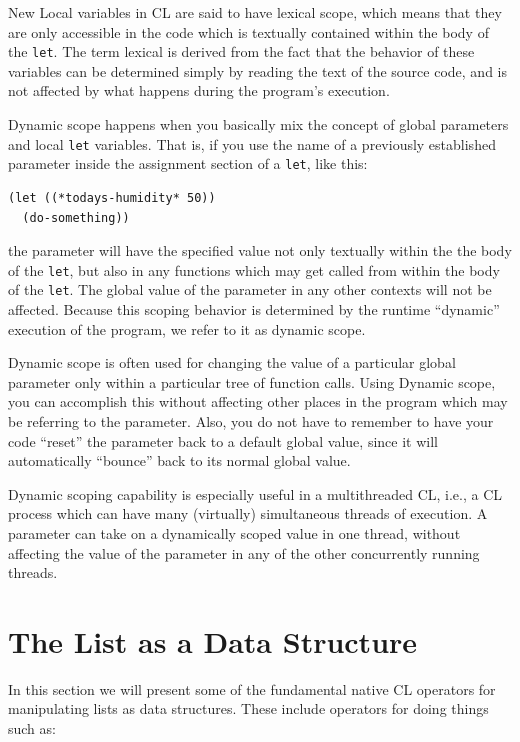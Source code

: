 New Local variables in CL are said to have lexical scope, which means that they are
only accessible in the code which is textually contained within the body of the \texttt{let}. The
term lexical is derived from the fact that the behavior of these variables can be determined
simply by reading the text of the source code, and is not affected by what happens during
the program's execution.

Dynamic scope happens when you basically mix the concept of global parameters and
local \texttt{let} variables. That is, if you use the name of a previously established parameter
inside the assignment section of a \texttt{let}, like this:

\begin{verbatim}
(let ((*todays-humidity* 50))
  (do-something))
\end{verbatim}

the parameter will have the specified value not only textually within the the body of the
\texttt{let}, but also in any functions which may get called from within the body of the \texttt{let}. The
global value of the parameter in any other contexts will not be affected. Because this scoping
behavior is determined by the runtime ``dynamic'' execution of the program, we refer to it
as dynamic scope.

Dynamic scope is often used for changing the value of a particular global parameter
only within a particular tree of function calls. Using Dynamic scope, you can accomplish
this without affecting other places in the program which may be referring to the parameter.
Also, you do not have to remember to have your code ``reset'' the parameter back to a
default global value, since it will automatically ``bounce'' back to its normal global value.

Dynamic scoping capability is especially useful in a multithreaded CL, i.e., a CL process
which can have many (virtually) simultaneous threads of execution. A parameter can take
on a dynamically scoped value in one thread, without affecting the value of the parameter
in any of the other concurrently running threads.

\section{The List as a Data Structure}

In this section we will present some of the fundamental native CL operators for manipulating
lists as data structures. These include operators for doing things such as:

